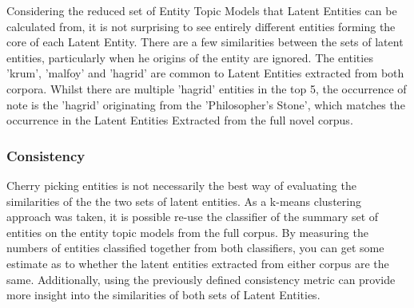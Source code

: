 \documentclass[10pt]{report}
\begin{document}
\begin{table}[h!]
  \caption{ Top 5 Entity Topic Models Forming the Latent Entities for the Harry Potter Summary Corpus.\label{tab:hp_summ_le_top}}
\end{table}
\renewcommand{\baselinestretch}{2.0}\normalsize
\renewcommand{\arraystretch}{1.0}

Considering the reduced set of Entity Topic Models that Latent Entities can be calculated from, it is not surprising to see entirely different entities forming the core of each Latent Entity. There are a few similarities between the sets of latent entities, particularly when he origins of the entity are ignored. The entities 'krum', 'malfoy' and 'hagrid' are common to Latent Entities extracted from both corpora. Whilst there are multiple 'hagrid' entities in the top 5, the occurrence of note is the 'hagrid' originating from the 'Philosopher's Stone', which matches the occurrence in the Latent Entities Extracted from the full novel corpus.

\subsubsection{Consistency}
Cherry picking entities is not necessarily the best way of evaluating the similarities of the the two sets of latent entities. As a k-means clustering approach was taken, it is possible re-use the classifier of the summary set of entities on the entity topic models from the full corpus. By measuring the numbers of entities classified together from both classifiers, you can get some estimate as to whether the latent entities extracted from either corpus are the same. Additionally, using the previously defined consistency metric can provide more insight into the similarities of both sets of Latent Entities.
\end{document}

